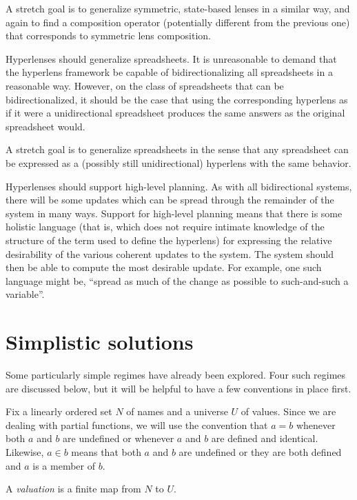 A stretch goal is to generalize symmetric, state-based lenses in a similar
way, and again to find a composition operator (potentially different from
the previous one) that corresponds to symmetric lens composition.

Hyperlenses should generalize spreadsheets. It is unreasonable to demand
that the hyperlens framework be capable of bidirectionalizing all
spreadsheets in a reasonable way. However, on the class of spreadsheets that
can be bidirectionalized, it should be the case that using the corresponding
hyperlens as if it were a unidirectional spreadsheet produces the same
answers as the original spreadsheet would.

A stretch goal is to generalize spreadsheets in the sense that any
spreadsheet can be expressed as a (possibly still unidirectional) hyperlens
with the same behavior.

Hyperlenses should support high-level planning. As with all bidirectional
systems, there will be some updates which can be spread through the
remainder of the system in many ways. Support for high-level planning means
that there is some holistic language (that is, which does not require
intimate knowledge of the structure of the term used to define the
hyperlens) for expressing the relative desirability of the various coherent
updates to the system. The system should then be able to compute the most
desirable update. For example, one such language might be, ``spread as much
of the change as possible to such-and-such a variable''.

\section{Simplistic solutions}
Some particularly simple regimes have already been explored. Four such
regimes are discussed below, but it will be helpful to have a few
conventions in place first.

Fix a linearly ordered set $N$ of names and a universe $U$ of values. Since
we are dealing with partial functions, we will use the convention that
$a = b$ whenever both $a$ and $b$ are undefined or whenever $a$ and $b$ are
defined and identical. Likewise, $a \in b$ means that both $a$ and $b$ are
undefined or they are both defined and $a$ is a member of $b$.

\begin{definition}
    A \emph{valuation} is a finite map from $N$ to $U$.
\end{definition}

